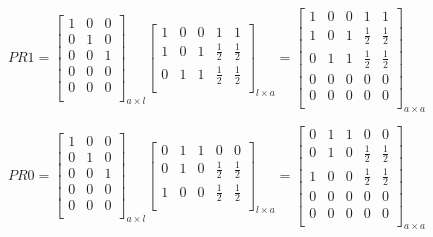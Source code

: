 \begin{anexosenv}
$$PR1=\left[
\begin{array}{ccc}
1 & 0 & 0 \\
0 & 1 & 0 \\
0 & 0 & 1 \\
0 & 0 & 0 \\
0 & 0 & 0 \\
\end{array}
\right]_{a \times l}
\left[
\begin{array}{ccccc}
1 & 0 & 0 & 1 & 1 \\
1 & 0 & 1 & \frac{1}{2} & \frac{1}{2} \\
0 & 1 & 1 & \frac{1}{2} & \frac{1}{2} \\
\end{array}
\right]_{l \times a}
= \left[
\begin{array}{ccccc}
1 & 0 & 0 & 1 & 1 \\
1 & 0 & 1 & \frac{1}{2} & \frac{1}{2} \\
0 & 1 & 1 & \frac{1}{2} & \frac{1}{2} \\
0 & 0 & 0 & 0 & 0 \\
0 & 0 & 0 & 0 & 0 \\
\end{array}
\right]_{a \times a}$$

$$PR0=\left[
\begin{array}{ccc}
1 & 0 & 0 \\
0 & 1 & 0 \\
0 & 0 & 1 \\
0 & 0 & 0 \\
0 & 0 & 0 \\
\end{array}
\right]_{a \times l}
\left[
\begin{array}{ccccc}
0 & 1 & 1 & 0 & 0 \\
0 & 1 & 0 & \frac{1}{2} & \frac{1}{2} \\
1 & 0 & 0 & \frac{1}{2} & \frac{1}{2} \\
\end{array}
\right]_{l \times a}
= \left[
\begin{array}{ccccc}
0 & 1 & 1 & 0 & 0 \\
0 & 1 & 0 & \frac{1}{2} & \frac{1}{2} \\
1 & 0 & 0 & \frac{1}{2} & \frac{1}{2} \\
0 & 0 & 0 & 0 & 0 \\
0 & 0 & 0 & 0 & 0 \\
\end{array}
\right]_{a \times a}$$


\end{anexosenv}
